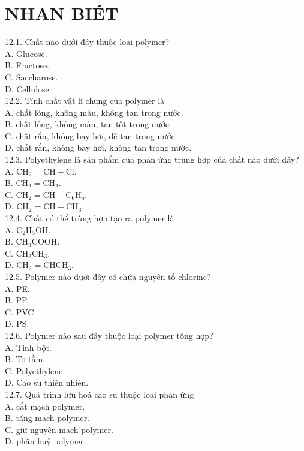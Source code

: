 \documentclass[10pt]{article}
\begin{document}
\section*{NHAN BIÉT}
12.1. Chất nào dưới đây thuộc loại polymer?\\
A. Glucose.\\
B. Fructose.\\
C. Saccharose.\\
D. Cellulose.\\
12.2. Tính chất vật lí chung của polymer là\\
A. chất lỏng, không màu, không tan trong nước.\\
B. chất lỏng, không màu, tan tốt trong nước.\\
C. chất rắn, không bay hơi, dễ tan trong nước.\\
D. chất rắn, không bay hơi, không tan trong nước.\\
12.3. Polyethylene là sản phẩm của phản ứng trùng hợp của chất nào dưới đây?\\
A. $\mathrm{CH}_{2}=\mathrm{CH}-\mathrm{Cl}$.\\
B. $\mathrm{CH}_{2}=\mathrm{CH}_{2}$.\\
C. $\mathrm{CH}_{2}=\mathrm{CH}-\mathrm{C}_{6} \mathrm{H}_{5}$.\\
D. $\mathrm{CH}_{2}=\mathrm{CH}-\mathrm{CH}_{3}$.\\
12.4. Chất có thể trùng hợp tạo ra polymer là\\
A. $\mathrm{C}_{2} \mathrm{H}_{5} \mathrm{OH}$.\\
B. $\mathrm{CH}_{3} \mathrm{COOH}$.\\
C. $\mathrm{CH}_{3} \mathrm{CH}_{3}$.\\
D. $\mathrm{CH}_{2}=\mathrm{CHCH}_{3}$.\\
12.5. Polymer nào dưới đây có chứa nguyên tố chlorine?\\
A. PE.\\
B. PP.\\
C. PVC.\\
D. PS.\\
12.6. Polymer nào sau đây thuộc loại polymer tổng hợp?\\
A. Tinh bột.\\
B. Tơ tằm.\\
C. Polyethylene.\\
D. Cao su thiên nhiên.\\
12.7. Quá trình lưu hoá cao su thuộc loại phản ứng\\
A. cắt mạch polymer.\\
B. tăng mạch polymer.\\
C. giữ nguyên mạch polymer.\\
D. phân huỷ polymer.
\end{document}
